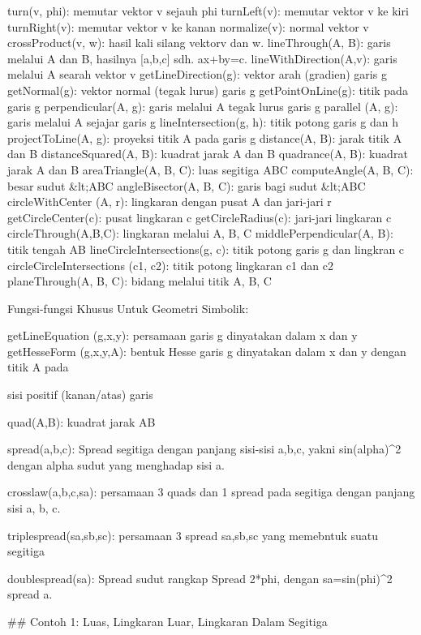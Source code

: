 \documentclass{article}
\begin{document}
  turn(v, phi): memutar vektor v sejauh phi  
  turnLeft(v):   memutar vektor v ke kiri  
  turnRight(v):  memutar vektor v ke kanan  
  normalize(v): normal vektor v  
  crossProduct(v, w): hasil kali silang vektorv dan w.  
  lineThrough(A, B): garis melalui A dan B, hasilnya [a,b,c] sdh. ax+by=c.  
  lineWithDirection(A,v): garis melalui A searah vektor v  
  getLineDirection(g): vektor arah (gradien) garis g  
  getNormal(g): vektor normal (tegak lurus) garis g  
  getPointOnLine(g):  titik pada garis g  
  perpendicular(A, g):  garis melalui A tegak lurus garis g  
  parallel (A, g):  garis melalui A sejajar garis g  
  lineIntersection(g, h):  titik potong garis g dan h  
  projectToLine(A, g):   proyeksi titik A pada garis g  
  distance(A, B):  jarak titik A dan B  
  distanceSquared(A, B):  kuadrat jarak A dan B  
  quadrance(A, B): kuadrat jarak A dan B  
  areaTriangle(A, B, C):  luas segitiga ABC  
  computeAngle(A, B, C):   besar sudut &lt;ABC  
  angleBisector(A, B, C): garis bagi sudut &lt;ABC  
  circleWithCenter (A, r): lingkaran dengan pusat A dan jari-jari r  
  getCircleCenter(c):  pusat lingkaran c  
  getCircleRadius(c):  jari-jari lingkaran c  
  circleThrough(A,B,C):  lingkaran melalui A, B, C  
  middlePerpendicular(A, B): titik tengah AB  
  lineCircleIntersections(g, c): titik potong garis g dan lingkran c  
  circleCircleIntersections (c1, c2):  titik potong lingkaran c1 dan c2  
  planeThrough(A, B, C):  bidang melalui titik A, B, C  

Fungsi-fungsi Khusus Untuk Geometri Simbolik:


  getLineEquation (g,x,y): persamaan garis g dinyatakan dalam x dan y  
  getHesseForm (g,x,y,A): bentuk Hesse garis g dinyatakan dalam x dan y dengan titik A pada  

sisi positif (kanan/atas) garis


  quad(A,B): kuadrat jarak AB


  spread(a,b,c): Spread segitiga dengan panjang sisi-sisi a,b,c, yakni sin(alpha)^2 dengan
alpha sudut yang menghadap sisi a.


  crosslaw(a,b,c,sa): persamaan 3 quads dan 1 spread pada segitiga dengan panjang sisi a, b,
c.


  triplespread(sa,sb,sc): persamaan 3 spread sa,sb,sc yang memebntuk suatu segitiga


  doublespread(sa): Spread sudut rangkap Spread 2*phi, dengan sa=sin(phi)^2 spread a.


## Contoh 1: Luas, Lingkaran Luar, Lingkaran Dalam Segitiga
\end{document}
